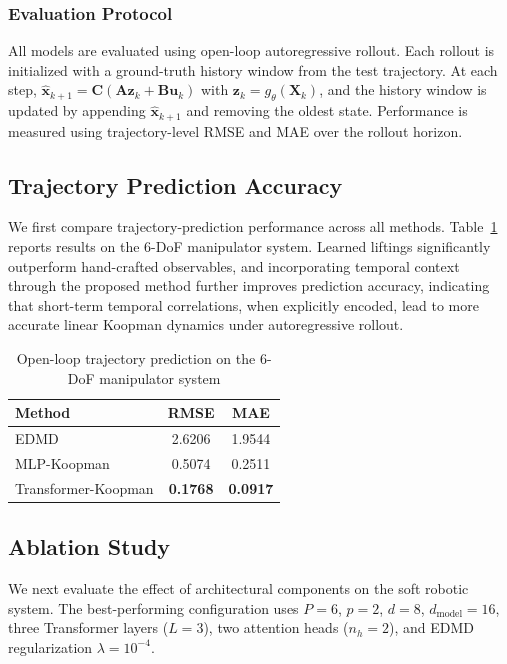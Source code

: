 \documentclass[journal]{IEEEtran}
\newcommand{\vx}{\mathbf{x}}
\newcommand{\vu}{\mathbf{u}}
\newcommand{\vz}{\mathbf{z}}
\newcommand{\mA}{\mathbf{A}}
\newcommand{\mB}{\mathbf{B}}
\newcommand{\mC}{\mathbf{C}}
\newcommand{\mX}{\mathbf{X}}
\begin{document}
\subsubsection{Evaluation Protocol}
\label{sec:eval_protocol}

All models are evaluated using open-loop autoregressive rollout. Each rollout is initialized with a ground-truth history window from the test trajectory. At each step, $\hat{\vx}_{k+1} = \mC(\mA \vz_k + \mB \vu_k)$ with $\vz_k = g_\theta(\mX_k)$, and the history window is updated by appending $\hat{\vx}_{k+1}$ and removing the oldest state. Performance is measured using trajectory-level RMSE and MAE over the rollout horizon.

\subsection{Trajectory Prediction Accuracy}

We first compare trajectory-prediction performance across all methods. Table~\ref{tab:prediction_platform_a} reports results on the 6-DoF manipulator system. Learned liftings significantly outperform hand-crafted observables, and incorporating temporal context through the proposed method further improves prediction accuracy, indicating that short-term temporal correlations, when explicitly encoded, lead to more accurate linear Koopman dynamics under autoregressive rollout.

\begin{table}[!t]
\renewcommand{\arraystretch}{1.2}
\caption{Open-loop trajectory prediction on the 6-DoF manipulator system}
\label{tab:prediction_platform_a}
\centering
\begin{tabular}{lcc}
\toprule
Method & RMSE & MAE \\
\midrule
EDMD & 2.6206 & 1.9544 \\
MLP-Koopman & 0.5074 & 0.2511 \\
Transformer-Koopman & \textbf{0.1768} & \textbf{0.0917} \\
\bottomrule
\end{tabular}
\end{table}

\subsection{Ablation Study}

We next evaluate the effect of architectural components on the soft robotic system. The best-performing configuration uses $P=6$, $p=2$, $d=8$, $d_{\mathrm{model}}=16$, three Transformer layers ($L=3$), two attention heads ($n_h=2$), and EDMD regularization $\lambda=10^{-4}$.
\end{document}
